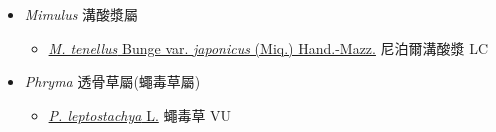
  \begin{itemize}
 \item[] \textit{Mimulus} 溝酸漿屬
                                
  \begin{itemize}
        \item[] \href{http://www.theplantlist.org/tpl1.1/search?q=Mimulus+tenellus+var.+japonicus}{\textit{M. tenellus} Bunge var. \textit{japonicus} (Miq.) Hand.-Mazz.}   尼泊爾溝酸漿   LC
  \end{itemize}
 \item[] \textit{Phryma} 透骨草屬(蠅毒草屬)
                                
  \begin{itemize}
        \item[] \href{http://www.theplantlist.org/tpl1.1/search?q=Phryma+leptostachya}{\textit{P. leptostachya} L.}   蠅毒草   VU
  \end{itemize}
  \end{itemize}
